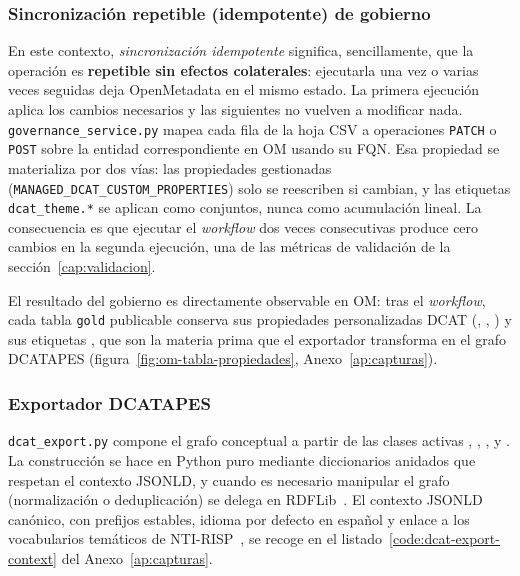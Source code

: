 \subsubsection{Sincronización repetible (idempotente) de gobierno}

En este contexto, \emph{sincronización idempotente} significa, sencillamente, que la operación es \textbf{repetible sin efectos colaterales}: ejecutarla una vez o varias veces seguidas deja OpenMetadata en el mismo estado. La primera ejecución aplica los cambios necesarios y las siguientes no vuelven a modificar nada. \texttt{governance\_service.py} mapea cada fila de la hoja \ac{CSV} a operaciones \texttt{PATCH} o \texttt{POST} sobre la entidad correspondiente en \ac{OM} usando su \ac{FQN}. Esa propiedad se materializa por dos vías: las propiedades gestionadas (\texttt{MANAGED\_DCAT\_CUSTOM\_PROPERTIES}) solo se reescriben si cambian, y las etiquetas \texttt{dcat\_theme.*} se aplican como conjuntos, nunca como acumulación lineal. La consecuencia es que ejecutar el \emph{workflow} dos veces consecutivas produce cero cambios en la segunda ejecución, una de las métricas de validación de la sección~\ref{cap:validacion}.

El resultado del gobierno es directamente observable en \ac{OM}: tras el \emph{workflow}, cada tabla \texttt{gold} publicable conserva sus propiedades personalizadas DCAT (, , ) y sus etiquetas , que son la materia prima que el exportador transforma en el grafo \ac{DCATAPES} (figura~\ref{fig:om-tabla-propiedades}, Anexo~\ref{ap:capturas}).

\subsubsection{Exportador \texorpdfstring{\ac{DCATAPES}}{DCAT-AP-ES}}

\texttt{dcat\_export.py} compone el grafo conceptual a partir de las clases activas , , ,  y . La construcción se hace en Python puro mediante diccionarios anidados que respetan el contexto \ac{JSONLD}, y cuando es necesario manipular el grafo (normalización o deduplicación) se delega en RDFLib~\cite{rdflib}. El contexto \ac{JSONLD} canónico, con prefijos estables, idioma por defecto en español y enlace a los vocabularios temáticos de NTI-RISP~\cite{datosGobNtiRisp}, se recoge en el listado~\ref{code:dcat-export-context} del Anexo~\ref{ap:capturas}.

